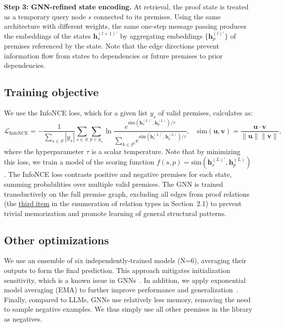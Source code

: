\textbf{Step 3: GNN-refined state encoding.} At retrieval, the proof state is treated as a temporary query node $s$ connected to its premises. Using the same architecture with different weights, the same one-step message passing produces the embeddings of the states $\mathbf{h}_s^{(l+1)'}$ by aggregating embeddings $\{\mathbf{h}_p^{(l)'}\}$ of premises referenced by the state. Note that the edge directions prevent information flow from states to dependencies or future premises to prior dependencies. 


\subsection{Training objective}
We use the InfoNCE \citep{infonce, rusak2024infonce} loss, which for a given list $y_s$ of valid premises, calculates as:
$$
\mathcal{L}_{\mathrm{InfoNCE}} = - \frac{1}{\sum_{s \in S} |y_s|} \sum_{s\in S} \sum_{p\in y_s}  \ln \frac{e^{\mathrm{sim}(\mathbf{h}_s^{(L)'},\mathbf{h}_p^{(L)})/\tau}}{\sum_{k\in P} e^{\mathrm{sim}(\mathbf{h}_s^{(L)'},\mathbf{h}_k^{(L)})/\tau}}, 
\quad 
\mathrm{sim}(\mathbf{u},\mathbf{v}) = \frac{\mathbf{u}\cdot \mathbf{v}}{\|\mathbf{u}\|\|\mathbf{v}\|},
$$
where the hyperparameter $\tau$ is a scalar temperature. Note that by minimizing this loss, we train a model of the scoring function $f(s, p) = \mathrm{sim}(\mathbf{h}_s^{(L)'}, \mathbf{h}_p^{(L)})$. The InfoNCE loss contrasts positive and negative premises for each state, summing probabilities over multiple valid premises. The GNN is trained transductively on the full premise graph, excluding all edges from proof relations (the \hyperref[par:relations:proofs]{third item} in the enumeration of relation types in Section~2.1) to prevent trivial memorization and promote learning of general structural patterns.

\subsection{Other optimizations}
We use an ensemble of six independently-trained models (N=6), averaging their outputs to form the final prediction. This approach mitigates initialization sensitivity, which is a known issue in GNNs~\citep{gnn_init}. In addition, we apply exponential model averaging (EMA) to further improve performance and generalization~\citep{ema}. Finally, compared to LLMs, GNNs use relatively less memory, removing the need to sample negative examples. We thus simply use all other premises in the library as negatives. 

